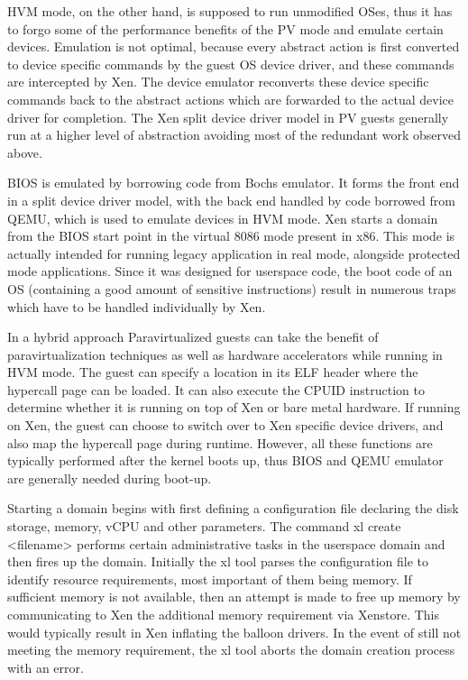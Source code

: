  

HVM mode, on the other hand, is supposed to run unmodified OSes, thus it has to forgo some of the performance benefits of the PV mode and emulate certain devices. Emulation is not optimal, because every abstract action is first converted to device specific commands by the guest OS device driver, and these commands are intercepted by Xen. The device emulator reconverts these device specific commands back to the abstract actions which are forwarded to the actual device driver for completion. The Xen split device driver model in PV guests generally run at a higher level of abstraction avoiding most of the redundant work observed above. 

 

BIOS is emulated by borrowing code from Bochs emulator. It forms the front end in a split device driver model, with the back end handled by code borrowed from QEMU, which is used to emulate devices in HVM mode. Xen starts a domain from the BIOS start point in the virtual 8086 mode present in x86. This mode is actually intended for running legacy application in real mode, alongside protected mode applications. Since it was designed for userspace code, the boot code of an OS (containing a good amount of sensitive instructions) result in numerous traps which have to be handled individually by Xen. 

 

In a hybrid approach Paravirtualized guests can take the benefit of paravirtualization techniques as well as hardware accelerators while running in HVM mode. The guest can specify a location in its ELF header where the hypercall page can be loaded. It can also execute the CPUID instruction to determine whether it is running on top of Xen or bare metal hardware. If running on Xen, the guest can choose to switch over to Xen specific device drivers, and also map the hypercall page during runtime. However, all these functions are typically performed after the kernel boots up, thus BIOS and QEMU emulator are generally needed during boot-up. 

 

Starting a domain begins with first defining a configuration file declaring the disk storage, memory, vCPU and other parameters. The command xl create <filename> performs certain administrative tasks in the userspace domain and then fires up the domain. Initially the xl tool parses the configuration file to identify resource requirements, most important of them being memory. If sufficient memory is not available, then an attempt is made to free up memory by communicating to Xen the additional memory requirement via Xenstore. This would typically result in Xen inflating the balloon drivers. In the event of still not meeting the memory requirement, the xl tool aborts the domain creation process with an error.  

